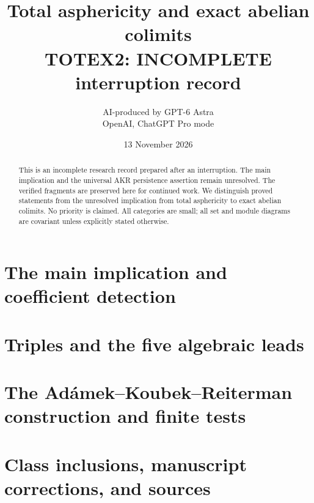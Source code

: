 \documentclass[11pt,a4paper]{article}
\title{Total asphericity and exact abelian colimits\\\large TOTEX2: INCOMPLETE interruption record}
\author{AI-produced by GPT-6 Astra\\OpenAI, ChatGPT Pro mode}
\date{13 November 2026}
\theoremstyle{definition}
\begin{document}
\maketitle
\begin{abstract}
This is an incomplete research record prepared after an interruption. The main implication and the universal AKR persistence assertion remain unresolved. The verified fragments are preserved here for continued work. We distinguish proved statements from the unresolved implication from total asphericity to exact abelian colimits. No priority is claimed. All categories are small; all set and module diagrams are covariant unless explicitly stated otherwise.
\end{abstract}
\tableofcontents
\section{The main implication and coefficient detection}

\section{Triples and the five algebraic leads}

\section{The Ad\'amek--Koubek--Reiterman construction and finite tests}

\section{Class inclusions, manuscript corrections, and sources}



\end{document}
